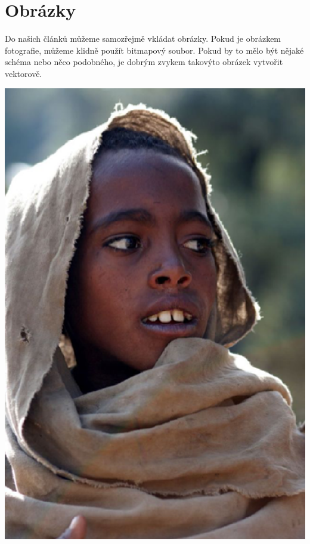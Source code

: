 \documentclass[a4paper, 11pt]{article}
\begin{document}
\section{Obrázky}
Do našich článků můžeme samozřejmě vkládat obrázky. Pokud je obrázkem fotografie, můžeme klidně použít bitmapový soubor. Pokud by to mělo být nějaké schéma nebo něco podobného, je dobrým zvykem takovýto obrázek vytvořit vektorově.
\begin{center}
	\includegraphics[scale = 0.4]{etiopan.eps}

\end{center}
\end{document}
